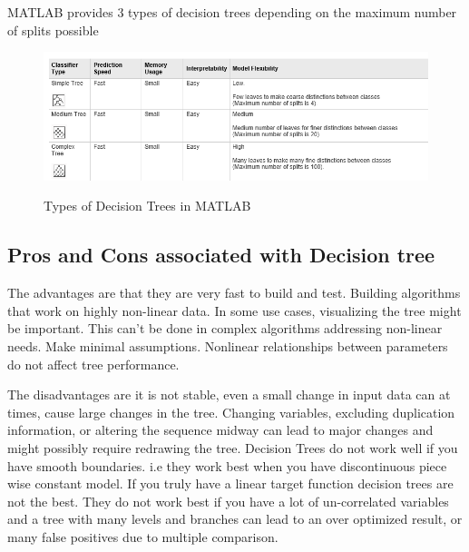 \noindent MATLAB provides 3 types of decision trees depending on the maximum number of splits possible


\begin{figure}[H]
\centering
{\includegraphics[scale=0.75]{table.png}}
\caption{Types of Decision Trees in MATLAB}
\end{figure}


\subsection{Pros and Cons associated with Decision tree} \label{Pros and Cons associated with Decision tree}

The advantages are that they are very fast to build and test. Building algorithms that work on highly non-linear data. In some use cases, visualizing the tree might be important. This can't be done in complex algorithms addressing non-linear needs.
Make minimal assumptions. Nonlinear relationships between parameters do not affect tree performance.

The disadvantages are it is not stable, even a small change in input data can at times, cause large changes in the tree. Changing variables, excluding duplication information, or altering the sequence midway can lead to major changes and might possibly require redrawing the tree. Decision Trees do not work well if you have smooth boundaries.  i.e they work best when you have discontinuous piece wise constant model. If you truly have a linear target function decision trees are not the best. They do not work best if you have a lot of un-correlated variables and a tree with many levels and branches can lead to an over optimized result, or many false positives due to multiple comparison.